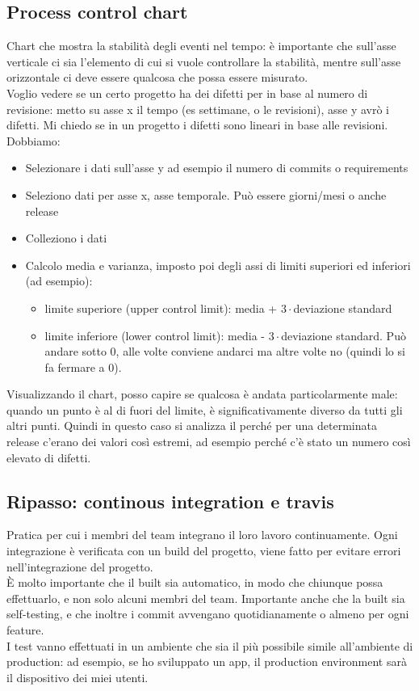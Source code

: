\documentclass{article}
\begin{document}
\subsection{Process control chart}
Chart che mostra la stabilità degli eventi nel tempo: è importante che sull'asse verticale ci sia l'elemento di cui si vuole controllare la stabilità, mentre sull'asse orizzontale ci deve essere qualcosa che possa essere misurato.\\
Voglio vedere se un certo progetto ha dei difetti per in base al numero di revisione: metto su asse x il tempo (es settimane, o le revisioni), asse y avrò i difetti. Mi chiedo se in un progetto i difetti sono lineari in base alle revisioni. Dobbiamo:
\begin{itemize}
\item Selezionare i dati sull'asse y ad esempio il numero di commits o requirements 
\item Seleziono dati per asse x, asse temporale. Può essere giorni/mesi o anche release
\item Colleziono i dati
\item Calcolo media e varianza, imposto poi degli assi di limiti superiori ed inferiori (ad esempio):
\begin{itemize}
\item limite superiore (upper control limit): media + $3\cdot$deviazione standard
\item limite inferiore (lower control limit): media - $3\cdot$deviazione standard. Può andare sotto 0, alle volte conviene andarci ma altre volte no (quindi lo si fa fermare a 0).
\end{itemize}
\end{itemize}
Visualizzando il chart, posso capire se qualcosa è andata particolarmente male: quando un punto è al di fuori del limite, è significativamente diverso da tutti gli altri punti. Quindi in questo caso si analizza il perché per una determinata release c'erano dei valori così estremi, ad esempio perché c'è stato un numero così elevato di difetti.
\subsection{Ripasso: continous integration e travis}
Pratica per cui i membri del team integrano il loro lavoro continuamente. Ogni integrazione è verificata con un build del progetto, viene fatto per evitare errori nell'integrazione del progetto.\\ È molto importante che il built sia automatico, in modo che chiunque possa effettuarlo, e non solo alcuni membri del team. Importante anche che la built sia self-testing, e che inoltre i commit avvengano quotidianamente o almeno per ogni feature.\\ I test vanno effettuati in un ambiente che sia il più possibile simile all'ambiente di production: ad esempio, se ho sviluppato un app, il production environment sarà il dispositivo dei miei utenti.
\end{document}
